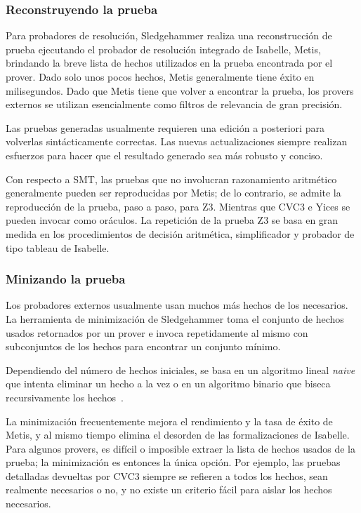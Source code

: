 \documentclass[12pt]{book}
\begin{document}
\subsubsection{Reconstruyendo la prueba}

Para probadores de resolución, Sledgehammer realiza una reconstrucción de prueba ejecutando el probador de resolución integrado de Isabelle, Metis, brindando la breve lista de hechos utilizados en la prueba encontrada por el prover. Dado solo unos pocos hechos, Metis generalmente tiene éxito en milisegundos. Dado que Metis tiene que volver a encontrar la prueba, los provers externos se utilizan esencialmente como filtros de relevancia de gran precisión.

Las pruebas generadas usualmente requieren una edición a posteriori para volverlas sintácticamente correctas. Las nuevas actualizaciones siempre realizan esfuerzos para hacer que el resultado generado sea más robusto y conciso.

Con respecto a SMT, las pruebas que no involucran razonamiento aritmético generalmente pueden ser reproducidas por Metis; de lo contrario, se admite la reproducción de la prueba, paso a paso, para Z3. Mientras que CVC3 e Yices se pueden invocar como oráculos. La repetición de la prueba Z3 se basa en gran medida en los procedimientos de decisión aritmética, simplificador y probador de tipo tableau de Isabelle.

\subsubsection{Minizando la prueba}

Los probadores externos usualmente usan muchos más hechos de los necesarios. La herramienta de minimización de Sledgehammer toma el conjunto de hechos usados retornados por un prover e invoca repetidamente al mismo con subconjuntos de los hechos para encontrar un conjunto mínimo.

Dependiendo del número de hechos iniciales, se basa en un algoritmo lineal \textit{naive} que intenta eliminar un hecho a la vez o en un algoritmo binario que biseca recursivamente los hechos~\cite{sledgehammer_judgement_day}.

La minimización frecuentemente mejora el rendimiento y la tasa de éxito de Metis, y al mismo tiempo elimina el desorden de las formalizaciones de Isabelle. Para algunos provers, es difícil o imposible extraer la lista de hechos usados de la prueba; la minimización es entonces la única opción. Por ejemplo, las pruebas detalladas devueltas por CVC3 siempre se refieren a todos los hechos, sean realmente necesarios o no, y no existe un criterio fácil para aislar los hechos necesarios.
\end{document}
